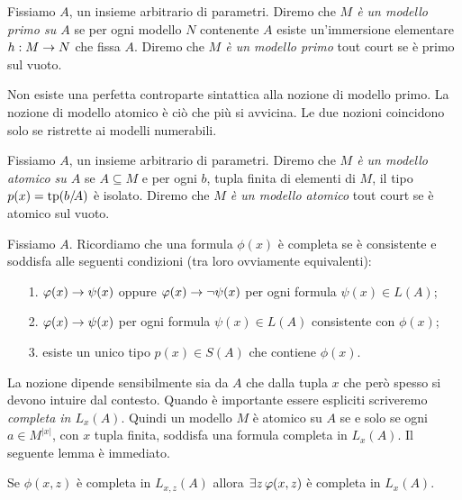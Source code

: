 \begin{definition}
Fissiamo $A$, un insieme arbitrario di parametri. Diremo che \emph{$M$ \`e un modello primo su $A$\/} se per ogni modello $N$ contenente $A$ esiste un'immersione elementare $h:M\rightarrow N$ che fissa $A$. Diremo che \emph{$M$ \`e un modello primo\/} tout court se \`e primo sul vuoto.\QED
\end{definition}

Non esiste una perfetta controparte sintattica alla nozione di modello primo. La nozione di modello atomico \`e ci\`o che pi\`u si avvicina. Le due nozioni coincidono solo se ristrette ai modelli numerabili.

\begin{definition}
Fissiamo $A$, un insieme arbitrario di parametri. Diremo che \emph{$M$ \`e un modello atomico su $A$\/} se $A\subseteq M$ e per ogni $b$, tupla finita di elementi di $M$, il tipo $p(x)=\textrm{tp}(b/\!A)$ \`e isolato. Diremo che \emph{$M$ \`e un modello atomico\/} tout court se \`e atomico sul vuoto.\QED
\end{definition}


Fissiamo $A$. Ricordiamo che una formula $\phi(x)$ \`e completa se \`e consistente e soddisfa alle seguenti condizioni (tra loro ovviamente equivalenti):
\begin{itemize}
 \item[1.] $\varphi(x)\rightarrow\psi(x)$ oppure $\varphi(x)\rightarrow\neg\psi(x)$
per ogni formula $\psi(x)\in L(A)$; 
\item[2.]  $\varphi(x)\rightarrow\psi(x)$ per ogni formula $\psi(x)\in L(A)$ consistente con $\phi(x)$;
\item[3.] esiste un unico tipo $p(x)\in S(A)$ che contiene $\phi(x)$.
\end{itemize}
La nozione dipende sensibilmente sia da $A$ che dalla tupla $x$ che per\`o spesso si devono intuire dal contesto. Quando \`e importante essere espliciti scriveremo \emph{completa in $L_x(A)$}. Quindi un modello $M$ \`e atomico su $A$ se e solo se ogni $a\in M^{|x|}$, con $x$ tupla finita, soddisfa una formula completa in $L_x(A)$. Il seguente lemma \`e immediato. 

\begin{lemma}\label{lem_isolazione1}
Se $\phi(x,z)$ \`e completa in $L_{x,z}(A)$ allora $\exists z\,\varphi(x,z)$ \`e completa in $L_{x}(A)$.\QED
\end{lemma}


